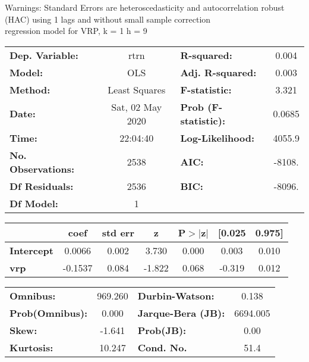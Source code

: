 Warnings: \newline
 [1] Standard Errors are heteroscedasticity and autocorrelation robust (HAC) using 1 lags and without small sample correction\\ 

regression model for VRP, k = 1 h = 9\begin{center}
\begin{tabular}{lclc}
\toprule
\textbf{Dep. Variable:}    &       rtrn       & \textbf{  R-squared:         } &     0.004   \\
\textbf{Model:}            &       OLS        & \textbf{  Adj. R-squared:    } &     0.003   \\
\textbf{Method:}           &  Least Squares   & \textbf{  F-statistic:       } &     3.321   \\
\textbf{Date:}             & Sat, 02 May 2020 & \textbf{  Prob (F-statistic):} &   0.0685    \\
\textbf{Time:}             &     22:04:40     & \textbf{  Log-Likelihood:    } &    4055.9   \\
\textbf{No. Observations:} &        2538      & \textbf{  AIC:               } &    -8108.   \\
\textbf{Df Residuals:}     &        2536      & \textbf{  BIC:               } &    -8096.   \\
\textbf{Df Model:}         &           1      & \textbf{                     } &             \\
\bottomrule
\end{tabular}
\begin{tabular}{lcccccc}
                   & \textbf{coef} & \textbf{std err} & \textbf{z} & \textbf{P$> |$z$|$} & \textbf{[0.025} & \textbf{0.975]}  \\
\midrule
\textbf{Intercept} &       0.0066  &        0.002     &     3.730  &         0.000        &        0.003    &        0.010     \\
\textbf{vrp}       &      -0.1537  &        0.084     &    -1.822  &         0.068        &       -0.319    &        0.012     \\
\bottomrule
\end{tabular}
\begin{tabular}{lclc}
\textbf{Omnibus:}       & 969.260 & \textbf{  Durbin-Watson:     } &    0.138  \\
\textbf{Prob(Omnibus):} &   0.000 & \textbf{  Jarque-Bera (JB):  } & 6694.005  \\
\textbf{Skew:}          &  -1.641 & \textbf{  Prob(JB):          } &     0.00  \\
\textbf{Kurtosis:}      &  10.247 & \textbf{  Cond. No.          } &     51.4  \\
\bottomrule
\end{tabular}
\end{center}


